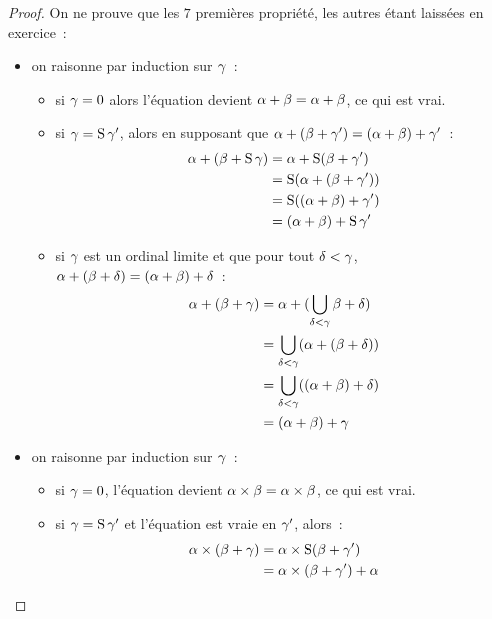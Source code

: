 \begin{proof}
  On ne prouve que les $7$ premières propriété, les autres étant laissées en
  exercice~:
  \begin{itemize}
  \item  on raisonne par induction sur $\gamma$~:
    \begin{itemize}
    \item si $\gamma = 0$ alors l'équation devient
      $\alpha + \beta = \alpha + \beta$, ce qui est vrai.
    \item si $\gamma = \operatorname{S}\gamma'$, alors en supposant que
      $\alpha + (\beta + \gamma') = (\alpha + \beta) + \gamma'$~:
      \begin{align*}
        \alpha + (\beta + \operatorname{S}\gamma) &= \alpha + \operatorname{S}(\beta + \gamma')\\
        &= \operatorname{S}(\alpha + (\beta + \gamma'))\\
        &= \operatorname{S}((\alpha + \beta) + \gamma')\\
        &= (\alpha + \beta) + \operatorname{S}\gamma'\\
      \end{align*}
    \item si $\gamma$ est un ordinal limite et que pour tout $\delta < \gamma$,
      $\alpha + (\beta + \delta) = (\alpha + \beta) + \delta$~:
      \begin{align*}
        \alpha + (\beta + \gamma) &= \alpha +
        (\bigcup_{\delta < \gamma} \beta + \delta)\\
        &= \bigcup_{\delta < \gamma} (\alpha + (\beta + \delta))\\
        &= \bigcup_{\delta < \gamma} ((\alpha + \beta) + \delta)\\
        &= (\alpha + \beta) + \gamma
      \end{align*}
    \end{itemize}
  \item on raisonne par induction sur $\gamma$~:
    \begin{itemize}
    \item si $\gamma = 0$, l'équation devient
      $\alpha \times \beta = \alpha \times \beta$, ce qui est vrai.
    \item si $\gamma = \operatorname{S}\gamma'$ et l'équation est vraie en $\gamma'$, alors~:
      \begin{align*}
        \varOa \times (\varOb + \varOc) &= \varOa \times \Ss(\varOb + \varOc')\\
        &= \varOa \times (\varOb + \varOc') + \varOa\\

\end{align*}
\end{itemize}
\end{itemize}
\end{proof}
